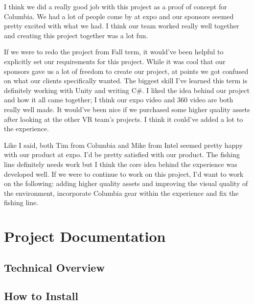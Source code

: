 \documentclass[10pt,journal,compsoc,onecolumn, draftclsnofoot]{IEEEtran}
\begin{document}
I think we did a really good job with this project as a proof of concept for Columbia. We had a lot of people come by at expo and our sponsors seemed pretty excited with what we had. I think our team worked really well together and creating this project together was a lot fun.

If we were to redo the project from Fall term, it would've been helpful to explicitly set our requirements for this project. While it was cool that our sponsors gave us a lot of freedom to create our project, at points we got confused on what our clients specifically wanted. The biggest skill I've learned this term is definitely working with Unity and writing C\#. I liked the idea behind our project and how it all came together; I think our expo video and 360 video are both really well made. It would've been nice if we purchased some higher quality assets after looking at the other VR team's projects. I think it could've added a lot to the experience.

Like I said, both Tim from Columbia and Mike from Intel seemed pretty happy with our product at expo. I'd be pretty satisfied with our product. The fishing line definitely needs work but I think the core idea behind the experience was developed well. If we were to continue to work on this project, I'd want to work on the following: adding higher quality assets and improving the visual quality of the environment, incorporate Columbia gear within the experience and fix the fishing line.

\clearpage

\vspace*{\fill}
\section*{}
\vspace*{\fill}


\section{Project Documentation}
\subsection{Technical Overview}
\subsection{How to Install}
\end{document}
